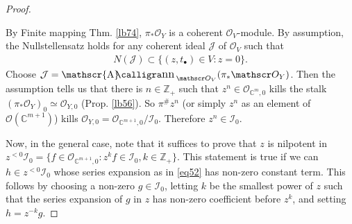 \documentclass[12pt,b5paper,notitlepage]{report}
\theoremstyle{definition}
\theoremstyle{plain}
\DeclareMathOperator{\sann}{\mathscr{A}\text{\kern -3pt {\calligra\large nn}}\,}
\newcommand{\mc}{\mathcal}
\newcommand{\scr}{\mathscr}
\newcommand{\blt}{\bullet}
\newcommand{\Cbb}{\mathbb C}
\newcommand{\Zbb}{\mathbb Z}
\numberwithin{equation}{section}
\begin{document}
\begin{proof}
\begin{figure}[h]
	\caption{}
	\label{fig2}
\end{figure}

By Finite mapping Thm. \ref{lb74}, $\pi_*\scr O_Y$ is a coherent $\scr O_V$-module. By assumption, the Nullstellensatz holds for any coherent ideal $\mc J$ of $\scr O_V$ such that
\begin{align*}
N(\mc J)\subset\{(z,t_\blt)\in V:z=0\}.
\end{align*}
Choose $\mc J=\sann_{\scr O_V}(\pi_*\scr O_Y)$. Then the assumption tells us that there is $n\in\Zbb_+$ such that $z^n\in\scr O_{\Cbb^m,0}$ kills the stalk $(\pi_*\scr O_Y)_0\simeq \scr O_{Y,0}$ (Prop. \ref{lb56}).  So $\pi^\# z^n$ (or simply $z^n$ as an element of $\scr O(\Cbb^{m+1})$) kills $\scr O_{Y,0}=\scr O_{\Cbb^{m+1},0}/\mc I_0$. Therefore $z^n\in\mc I_0$.

Now, in the general case, note that it suffices to prove that $z$ is nilpotent in $z^{<0}\mc I_0=\{f\in\scr O_{\Cbb^{m+1},0}:z^kf\in\mc I_0,k\in\Zbb_+\}$. This statement is true if we can $h\in z^{<0}\mc I_0$ whose series expansion as in \eqref{eq52} has non-zero constant term. This follows by choosing a non-zero $g\in\mc I_0$, letting $k$ be the smallest power of $z$ such that the series expansion of $g$ in $z$ has non-zero coefficient before $z^k$, and setting $h=z^{-k}g$.
\end{proof}
\end{document}
